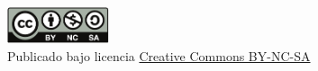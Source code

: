 
\thispagestyle{empty}


\vspace*{3cm}

\begin{center}
	\includegraphics[width=3cm]{img/by-nc-sa.pdf}\\ \bigskip
	Publicado bajo licencia \href{http://creativecommons.org/licenses/by-nc-sa/3.0/}{Creative Commons BY-NC-SA}
\end{center}